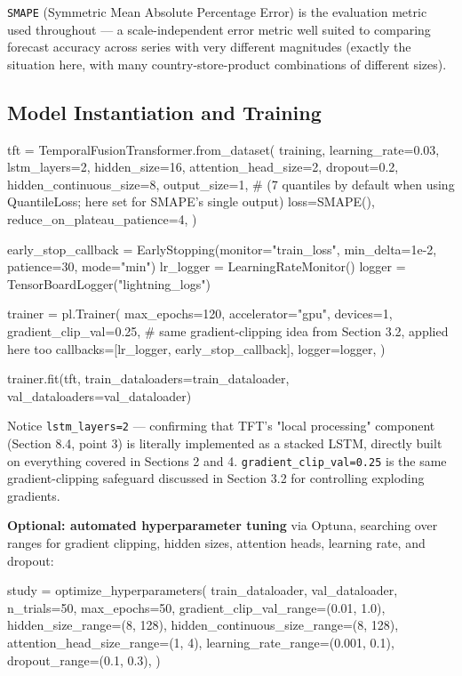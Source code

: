 \documentclass[12pt,openany]{book}
\theoremstyle{definition}
\theoremstyle{remark}
\begin{document}
\texttt{SMAPE} (Symmetric Mean Absolute Percentage Error) is the evaluation metric used throughout --- a scale-independent error metric well suited to comparing forecast accuracy across series with very different magnitudes (exactly the situation here, with many country-store-product combinations of different sizes).

\subsection{Model Instantiation and Training}

\begin{python}
tft = TemporalFusionTransformer.from_dataset(
    training,
    learning_rate=0.03,
    lstm_layers=2,
    hidden_size=16,
    attention_head_size=2,
    dropout=0.2,
    hidden_continuous_size=8,
    output_size=1,          # (7 quantiles by default when using QuantileLoss; here set for SMAPE's single output)
    loss=SMAPE(),
    reduce_on_plateau_patience=4,
)

early_stop_callback = EarlyStopping(monitor="train_loss", min_delta=1e-2, patience=30, mode="min")
lr_logger = LearningRateMonitor()
logger = TensorBoardLogger("lightning_logs")

trainer = pl.Trainer(
    max_epochs=120,
    accelerator="gpu", devices=1,
    gradient_clip_val=0.25,          # same gradient-clipping idea from Section 3.2, applied here too
    callbacks=[lr_logger, early_stop_callback],
    logger=logger,
)

trainer.fit(tft, train_dataloaders=train_dataloader, val_dataloaders=val_dataloader)
\end{python}

Notice \texttt{lstm\_layers=2} --- confirming that TFT's "local processing" component (Section 8.4, point 3) is literally implemented as a stacked LSTM, directly built on everything covered in Sections 2 and 4. \texttt{gradient\_clip\_val=0.25} is the same gradient-clipping safeguard discussed in Section 3.2 for controlling exploding gradients.

\textbf{Optional: automated hyperparameter tuning} via Optuna, searching over ranges for gradient clipping, hidden sizes, attention heads, learning rate, and dropout:

\begin{python}
study = optimize_hyperparameters(
    train_dataloader, val_dataloader,
    n_trials=50, max_epochs=50,
    gradient_clip_val_range=(0.01, 1.0),
    hidden_size_range=(8, 128),
    hidden_continuous_size_range=(8, 128),
    attention_head_size_range=(1, 4),
    learning_rate_range=(0.001, 0.1),
    dropout_range=(0.1, 0.3),
)
\end{python}
\end{document}
